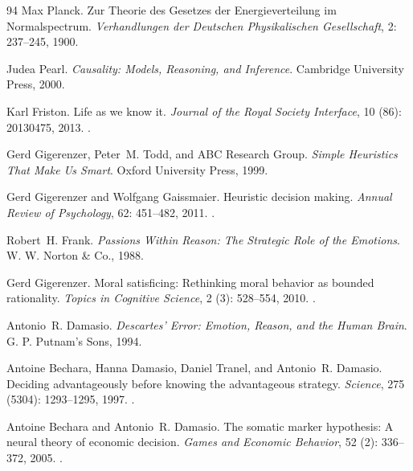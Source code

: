 \documentclass[11pt]{article}
\theoremstyle{plain}
\theoremstyle{definition}
\theoremstyle{remark}
\begin{document}
\begin{thebibliography}{94}
Max Planck.
\newblock Zur {Theorie} des {Gesetzes} der {Energieverteilung} im
  {Normalspectrum}.
\newblock \emph{Verhandlungen der Deutschen Physikalischen Gesellschaft},
  2: 237--245, 1900.

Judea Pearl.
\newblock \emph{Causality: Models, Reasoning, and Inference}.
\newblock Cambridge University Press, 2000.

Karl Friston.
\newblock Life as we know it.
\newblock \emph{Journal of the Royal Society Interface}, 10
  (86): 20130475, 2013.
\newblock {}.

Gerd Gigerenzer, Peter~M. Todd, and {ABC Research Group}.
\newblock \emph{Simple Heuristics That Make Us Smart}.
\newblock Oxford University Press, 1999.

Gerd Gigerenzer and Wolfgang Gaissmaier.
\newblock Heuristic decision making.
\newblock \emph{Annual Review of Psychology}, 62: 451--482, 2011.
\newblock {}.

Robert~H. Frank.
\newblock \emph{Passions Within Reason: The Strategic Role of the Emotions}.
\newblock W. W. Norton \& Co., 1988.

Gerd Gigerenzer.
\newblock Moral satisficing: Rethinking moral behavior as bounded rationality.
\newblock \emph{Topics in Cognitive Science}, 2 (3):
  528--554, 2010.
\newblock {}.

Antonio~R. Damasio.
\newblock \emph{Descartes' Error: Emotion, Reason, and the Human Brain}.
\newblock G. P. Putnam's Sons, 1994.

Antoine Bechara, Hanna Damasio, Daniel Tranel, and Antonio~R. Damasio.
\newblock Deciding advantageously before knowing the advantageous strategy.
\newblock \emph{Science}, 275 (5304): 1293--1295, 1997.
\newblock {}.

Antoine Bechara and Antonio~R. Damasio.
\newblock The somatic marker hypothesis: A neural theory of economic decision.
\newblock \emph{Games and Economic Behavior}, 52 (2):
  336--372, 2005.
\newblock {}.


\end{thebibliography}
\end{document}
